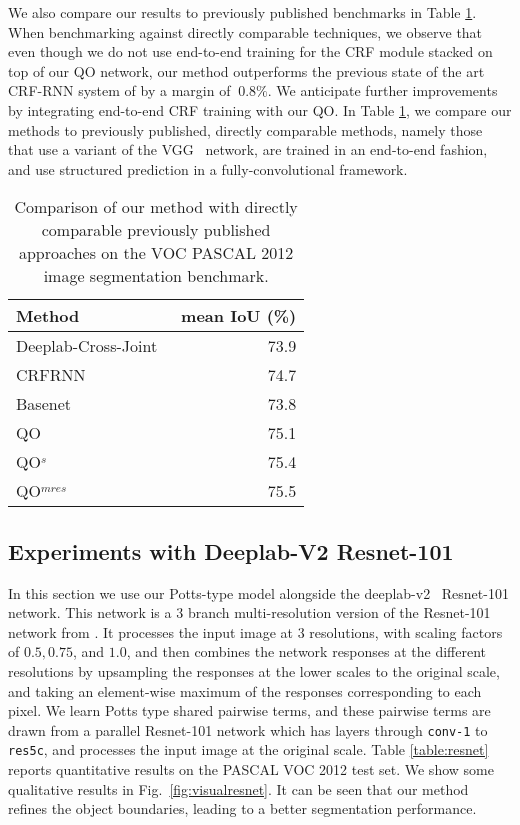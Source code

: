 \documentclass[runningheads]{llncs}
\begin{document}
We also compare our results to previously published benchmarks in Table \ref{table:allresults}.
When benchmarking against directly comparable techniques, we observe that even though we do not use end-to-end training for the CRF module stacked on top of our QO network, our 
 method outperforms the previous state of the art CRF-RNN system of \cite{crfrnn} by a margin of $~0.8\%$. We anticipate further improvements by integrating end-to-end CRF training with our QO. 
In Table \ref{table:allresults}, we compare our methods to previously published, directly comparable methods,
namely those that use a variant of the VGG~\cite{vgg} network, are trained in an end-to-end fashion, 
and use structured prediction in a fully-convolutional framework.
\begin{table}[tbh]
\centering
 \begin{tabular}{l|r}
 \hline
 Method & mean IoU (\%) \\ \hline
Deeplab-Cross-Joint~\cite{deeplab2} & 73.9 \\ \hline
CRFRNN~\cite{crfrnn} & 74.7 \\ \hline
Basenet & 73.8 \\ \hline
QO & 75.1  \\ \hline
QO$^s$ & 75.4 \\ \hline
QO$^{mres}$ & 75.5 \\ \hline
  \end{tabular}
  \vspace{2mm}
  \caption{Comparison of our method with directly comparable previously published approaches on the VOC PASCAL 2012 image segmentation benchmark.}
  \label{table:allresults}
\end{table}

\subsection{Experiments with Deeplab-V2 Resnet-101}
In this section we use our Potts-type model alongside the deeplab-v2~\cite{deeplabv2} Resnet-101 network.
This network is a $3$ branch multi-resolution version of the Resnet-101 network from \cite{resnet}. It processes
the input image at $3$ resolutions, with scaling factors of $0.5, 0.75$, and $1.0$, and then combines the network
responses at the different resolutions by upsampling the responses at the lower scales to the original scale, and
 taking an element-wise maximum of the responses corresponding to each pixel. We learn Potts type shared
 pairwise terms, and these pairwise terms are drawn from a parallel Resnet-101 network which has layers through
 \texttt{conv-1} to \texttt{res5c}, and processes the input image at the original scale. Table \ref{table:resnet} reports
 quantitative results on the PASCAL VOC 2012 test set. We show some qualitative results in Fig.~\ref{fig:visualresnet}.
It can be seen that our method refines the object boundaries, leading to a better segmentation performance.
 
\end{document}
